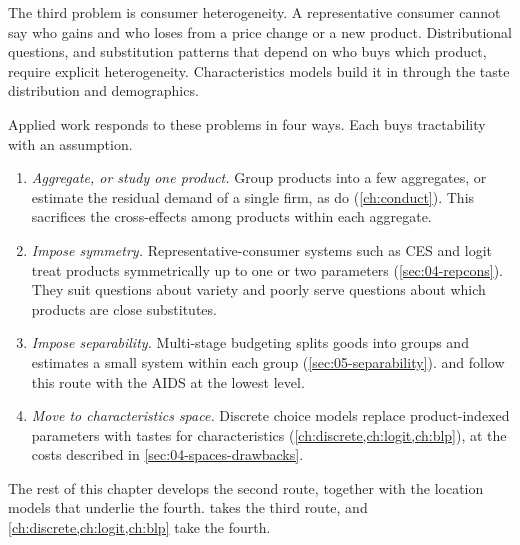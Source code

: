 The third problem is consumer heterogeneity. A representative consumer cannot say who gains and who loses from a
price change or a new product. Distributional questions, and substitution patterns that depend on who buys which
product, require explicit heterogeneity. Characteristics models build it in through the taste distribution and
demographics.

Applied work responds to these problems in four ways. Each buys tractability with an assumption.
\begin{enumerate}
  \item \emph{Aggregate, or study one product.} Group products into a few aggregates, or estimate the residual
  demand of a single firm, as \citet{BakerBresnahan1988} do (\cref{ch:conduct}). This sacrifices the cross-effects
  among products within each aggregate.
  \item \emph{Impose symmetry.} Representative-consumer systems such as CES and logit treat products symmetrically
  up to one or two parameters (\cref{sec:04-repcons}). They suit questions about variety and poorly serve questions
  about which products are close substitutes.
  \item \emph{Impose separability.} Multi-stage budgeting splits goods into groups and estimates a small system within
  each group (\cref{sec:05-separability}). \citet{HausmanLeonardZona1994} and \citet{Hausman1997} follow this route
  with the AIDS at the lowest level.
  \item \emph{Move to characteristics space.} Discrete choice models replace product-indexed parameters with tastes for
  characteristics (\cref{ch:discrete,ch:logit,ch:blp}), at the costs described in \cref{sec:04-spaces-drawbacks}.
\end{enumerate}
The rest of this chapter develops the second route, together with the location models that underlie the fourth.
 takes the third route, and \cref{ch:discrete,ch:logit,ch:blp} take the fourth.

